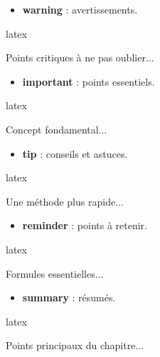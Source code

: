 \documentclass[
    french,
    margin=2cm
]{neoschool}
\begin{document}
\begin{itemize}
\item \textbf{warning} : avertissements.
\end{itemize}

\begin{code}{latex}
\begin{warning}[Attention !][\faExclamationTriangle]
    Points critiques à ne pas oublier...
\end{warning}
\end{code}

\begin{itemize}
\item \textbf{important} : points essentiels.
\end{itemize}

\begin{code}{latex}
\begin{important}
    Concept fondamental...
\end{important}
\end{code}

\begin{itemize}
\item \textbf{tip} : conseils et astuces.
\end{itemize}

\begin{code}{latex}
\begin{tip}
    Une méthode plus rapide...
\end{tip}
\end{code}

\begin{itemize}
\item
  \textbf{reminder} : points à retenir.
\end{itemize}

\begin{code}{latex}
\begin{reminder}[À mémoriser]
    Formules essentielles...
\end{reminder}
\end{code}

\begin{itemize}
\item \textbf{summary} : résumés.
\end{itemize}

\begin{code}{latex}
\begin{summary}[En bref]
    Points principaux du chapitre...
\end{summary}
\end{code}
\end{document}
